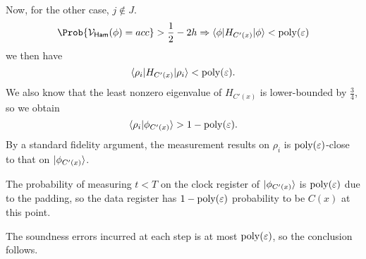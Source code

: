 \begin{prf}
	Now, for the other case, $j\notin J$.
	$$\Prob{\cV_\GS(\phi)=acc}>\frac{1}{2}-2h\Rightarrow\braket{\phi|H_{C'(x)}|\phi}<\poly(\varepsilon)$$
	we then have
	$$\braket{\rho_i|H_{C'(x)}|\rho_i}<\operatorname*{\operatorname{poly}}(\varepsilon).$$
	We also know that the least nonzero eigenvalue of $H_{C'(x)}$ is lower-bounded by $\frac{3}{4}$, so we obtain
	$$\braket{\rho_i|\phi_{C'(x)}}>1-\operatorname*{\operatorname{poly}}(\varepsilon).$$
	By a standard fidelity argument, the measurement results on $\rho_i$ is $\operatorname*{\operatorname{poly}}(\varepsilon)$-close to that on $\ket{\phi_{C'(x)}}$.

	The probability of measuring $t<T$ on the clock register of $\ket{\phi_{C'(x)}}$ is $\operatorname*{\operatorname{poly}}(\varepsilon)$ due to the padding,
	so the data register has $1-\operatorname*{\operatorname{poly}}(\varepsilon)$ probability to be $C(x)$ at this point.

	The soundness errors incurred at each step is at most $\operatorname*{\operatorname{poly}}(\varepsilon)$, so the conclusion follows.
\end{prf}
